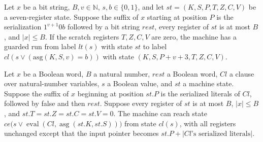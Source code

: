 \begin{theorem}
\label{Complexity.LogProg.TQBFARM.lit_run}
\leanok
{}
Let $x$ be a bit string, $B,v\in\mathbb{N}$, $s,b\in\{0,1\}$, and let
$st=(K,S,P,T,Z,C,V)$ be a seven-register state. Suppose the suffix of $x$ starting at
position $P$ is the serialization $1^{v+1}0b$ followed by a bit string $rest$, every
register of $st$ is at most $B$, and $|x|\leq B$. If the scratch registers $T,Z,C,V$ are
zero, the machine has a guarded run from label $lt(s)$ with state $st$ to label
$cl(s\lor(\mathrm{asg}(K,S,v)=b))$ with state $(K,S,P+v+3,T,Z,C,V)$.
\end{theorem}

\begin{theorem}
\label{Complexity.LogProg.TQBFARM.clause_run}
\leanok
{}
Let $x$ be a Boolean word, $B$ a natural number, $rest$ a Boolean word, $Cl$ a clause
over natural-number variables, $s$ a Boolean value, and $st$ a machine state. Suppose
the suffix of $x$ beginning at position $st.P$ is the serialized literals of $Cl$,
followed by false and then $rest$. Suppose every register of $st$ is at most $B$,
$|x|\le B$, and $st.T=st.Z=st.C=st.V=0$. The machine can reach state $ce\bigl(s\lor
\operatorname{eval}(Cl,\operatorname{asg}(st.K,st.S))\bigr)$ from state $cl(s)$, with
all registers unchanged except that the input pointer becomes $st.P+|Cl\text{'s
serialized literals}|$.
\end{theorem}

